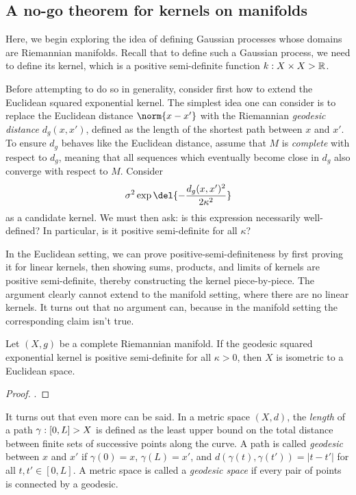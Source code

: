 \documentclass[11pt]{book}
\begin{document}
\subsection{A no-go theorem for kernels on manifolds}

Here, we begin exploring the idea of defining Gaussian processes whose domains are Riemannian manifolds.
Recall that to define such a Gaussian process, we need to define its kernel, which is a positive semi-definite function $k : X \times X \-> \mathbb{R}$.

\label{ntn:geodesic}
Before attempting to do so in generality, consider first how to extend the Euclidean squared exponential kernel.
The simplest idea one can consider is to replace the Euclidean distance $\norm{x-x'}$ with the Riemannian \emph{geodesic distance} $d_g(x,x')$, defined as the length of the shortest path between $x$ and $x'$.
To ensure $d_g$ behaves like the Euclidean distance, assume that $M$ is \emph{complete} with respect to $d_g$, meaning that all sequences which eventually become close in $d_g$ also converge with respect to $M$.
Consider
\[
\sigma^2 \exp\del{-\frac{d_g(x,x')^2}{2\kappa^2}}
\]
as a candidate kernel.
We must then ask: is this expression necessarily well-defined? 
In particular, is it positive semi-definite for all $\kappa$?

In the Euclidean setting, we can prove positive-semi-definiteness by first proving it for linear kernels, then showing sums, products, and limits of kernels are positive semi-definite, thereby constructing the kernel piece-by-piece.
The argument clearly cannot extend to the manifold setting, where there are no linear kernels.
It turns out that no argument can, because in the manifold setting the corresponding claim isn't true.

\begin{result}
Let $(X,g)$ be a complete Riemannian manifold.
If the geodesic squared exponential kernel is positive semi-definite for all $\kappa > 0$, then $X$ is isometric to a Euclidean space.
\end{result}

\begin{proof}
\textcite[Theorem 2]{feragen15}.
\end{proof}

It turns out that even more can be said.
In a metric space $(X,d)$, the \emph{length} of a path  $\gamma : [0,L] \-> X$ is defined as the least upper bound on the total distance between finite sets of successive points along the curve.
A path is called \emph{geodesic} between $x$ and $x'$ if $\gamma(0) = x$, $\gamma(L) = x'$, and $d(\gamma(t),\gamma(t')) = |t - t'|$ for all $t,t'\in[0,L]$.
A metric space is called a \emph{geodesic space} if every pair of points is connected by a geodesic.
\end{document}
